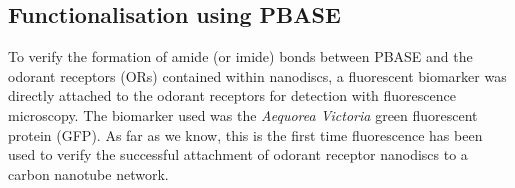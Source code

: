 \documentclass[
  a4paper,
]{scrbook}
\begin{document}
\hypertarget{sec-PBASE-GFP-OR-attachment}{%
\subsection{Functionalisation using
PBASE}\label{sec-PBASE-GFP-OR-attachment}}

To verify the formation of amide (or imide) bonds between PBASE and the
odorant receptors (ORs) contained within nanodiscs, a fluorescent
biomarker was directly attached to the odorant receptors for detection
with fluorescence microscopy. The biomarker used was the \emph{Aequorea
Victoria} green fluorescent protein (GFP). As far as we know, this is
the first time fluorescence has been used to verify the successful
attachment of odorant receptor nanodiscs to a carbon nanotube network.

\begin{figure}

\begin{minipage}[t]{0.47\linewidth}

{\centering 


}

\subcaption{\label{fig-PBASE-GFP-OR-ch3-zoom}}
\end{minipage}%
%
\begin{minipage}[t]{0.05\linewidth}

{\centering 

~

}


\end{minipage}
\end{figure}
\end{document}
